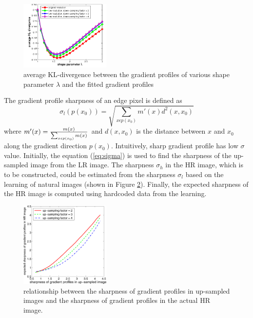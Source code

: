 \documentclass[a4paper,11pt]{article}
\begin{document}
\begin{figure}[H]
	\centering
	\includegraphics[width=0.4\textwidth]{3-Figure2-1.png}
	\caption{average KL-divergence between the gradient profiles of various shape parameter $\lambda$ and the fitted gradient profiles}
	\label{fig:shapep}
\end{figure}

The gradient profile sharpness of an edge pixel is defined as
\begin{equation}
	\label{eq:sigma}
	\sigma_l(p(x_0)) = \sqrt{\sum_{x \epsilon p(x_0)} m'(x) d^2(x, x_0)}
\end{equation}
where $m'(x) = {m(x) \over \sum_{x \epsilon p(x_0)} m(x)}$ and $d(x,x_0)$ is the distance between $x$ and $x_0$ along the gradient direction $p(x_0)$. Intuitively, sharp gradient profile has low $\sigma$ value. Initially, the equation (\ref{eq:sigma}) is used to find the sharpness of the up-sampled image from the LR image. The sharpness $\sigma_h$ in the HR image, which is to be constructed, could be estimated from the sharpness $\sigma_l$ based on the learning of natural images (shown in Figure \ref{fig:es}). Finally, the expected sharpness of the HR image is computed using hardcoded data from the learning.

\begin{figure}[H]
	\centering
	\includegraphics[width=0.4\textwidth]{Expected-sharpness-of-the-gradient-profiles-in-HR-image-with-respect-to-sharpness-of-the.png}
	\caption{relationship between the sharpness of gradient profiles in up-sampled images and the sharpness of gradient profiles in the actual HR image.}
	\label{fig:es}
\end{figure}
\end{document}
